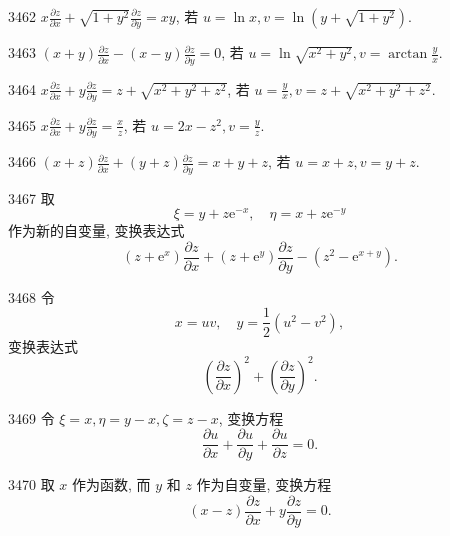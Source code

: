 
\begin{prob}[S]{3462}
$x\frac{\partial z}{\partial x} + \sqrt{1+y^2}\frac{\partial z}{\partial y} = xy$, 若 $u = \ln x, v = \ln(y+\sqrt{1+y^2})$.
\end{prob}

\begin{prob}[S]{3463}
$(x+y)\frac{\partial z}{\partial x} - (x-y)\frac{\partial z}{\partial y} = 0$, 若 $u = \ln\sqrt{x^2+y^2}, v = \arctan\frac{y}{x}$.
\end{prob}

\begin{prob}[S]{3464}
$x\frac{\partial z}{\partial x} + y\frac{\partial z}{\partial y} = z + \sqrt{x^2+y^2+z^2}$, 若 $u = \frac{y}{x}, v = z + \sqrt{x^2+y^2+z^2}$.
\end{prob}

\begin{prob}[S]{3465}
$x\frac{\partial z}{\partial x} + y\frac{\partial z}{\partial y} = \frac{x}{z}$, 若 $u = 2x - z^2, v = \frac{y}{z}$.
\end{prob}

\begin{prob}[S]{3466}
$(x+z)\frac{\partial z}{\partial x} + (y+z)\frac{\partial z}{\partial y} = x+y+z$, 若 $u = x+z, v = y+z$.
\end{prob}

\begin{prob}[M]{3467}
取
\[
\xi = y + z\mathrm{e}^{-x}, \quad \eta = x + z\mathrm{e}^{-y}
\]
作为新的自变量, 变换表达式
\[
(z+\mathrm{e}^x)\frac{\partial z}{\partial x} + (z+\mathrm{e}^y)\frac{\partial z}{\partial y} - (z^2 - \mathrm{e}^{x+y}).
\]
\end{prob}

\begin{prob}[M]{3468}
令
\[
x = uv, \quad y = \frac{1}{2}(u^2 - v^2),
\]
变换表达式
\[
\left(\frac{\partial z}{\partial x}\right)^2 + \left(\frac{\partial z}{\partial y}\right)^2.
\]
\end{prob}

\begin{prob}[M]{3469}
令 $\xi = x, \eta = y - x, \zeta = z - x$, 变换方程
\[
\frac{\partial u}{\partial x} + \frac{\partial u}{\partial y} + \frac{\partial u}{\partial z} = 0.
\]
\end{prob}

\begin{prob}[M]{3470}
取 $x$ 作为函数, 而 $y$ 和 $z$ 作为自变量, 变换方程
\[
(x-z)\frac{\partial z}{\partial x} + y\frac{\partial z}{\partial y} = 0.
\]
\end{prob}

